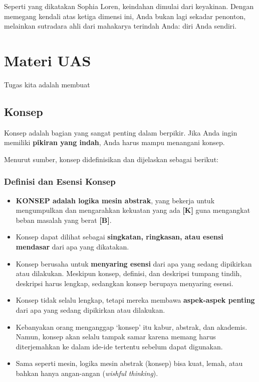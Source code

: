 \documentclass[
  letterpaper,
  DIV=11,
  numbers=noendperiod]{scrreprt}
\providecommand{\tightlist}{%
  \setlength{\itemsep}{0pt}\setlength{\parskip}{0pt}}
\begin{document}
Seperti yang dikatakan Sophia Loren, keindahan dimulai dari keyakinan.
Dengan memegang kendali atas ketiga dimensi ini, Anda bukan lagi sekadar
penonton, melainkan sutradara ahli dari mahakarya terindah Anda: diri
Anda sendiri.


\chapter{Materi UAS}\label{materi-uas}

Tugas kita adalah membuat

\section{Konsep}\label{konsep}

Konsep adalah bagian yang sangat penting dalam berpikir. Jika Anda ingin
memiliki \textbf{pikiran yang indah}, Anda harus mampu menangani konsep.

Menurut sumber, konsep didefinisikan dan dijelaskan sebagai berikut:

\subsection{Definisi dan Esensi
Konsep}\label{definisi-dan-esensi-konsep}

\begin{itemize}
\tightlist
\item
  \textbf{KONSEP adalah logika mesin abstrak}, yang bekerja untuk
  mengumpulkan dan mengarahkan kekuatan yang ada \textbf{{[}K{]}} guna
  mengangkat beban masalah yang berat \textbf{{[}B{]}}.
\item
  Konsep dapat dilihat sebagai \textbf{singkatan, ringkasan, atau esensi
  mendasar} dari apa yang dikatakan.
\item
  Konsep berusaha untuk \textbf{menyaring esensi} dari apa yang sedang
  dipikirkan atau dilakukan. Meskipun konsep, definisi, dan deskripsi
  tumpang tindih, deskripsi harus lengkap, sedangkan konsep berupaya
  menyaring esensi.
\item
  Konsep tidak selalu lengkap, tetapi mereka membawa \textbf{aspek-aspek
  penting} dari apa yang sedang dipikirkan atau dilakukan.
\item
  Kebanyakan orang menganggap `konsep' itu kabur, abstrak, dan akademis.
  Namun, konsep akan selalu tampak samar karena memang harus
  diterjemahkan ke dalam ide-ide tertentu sebelum dapat digunakan.
\item
  Sama seperti mesin, logika mesin abstrak (konsep) bisa kuat, lemah,
  atau bahkan hanya angan-angan (\emph{wishful thinking}).
\end{itemize}
\end{document}
